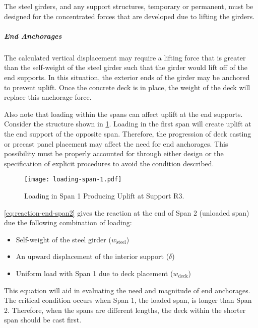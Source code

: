The steel girders, and any support structures, temporary or permanent, must be designed for the concentrated
forces that are developed due to lifting the girders.

\subparagraph*{End Anchorages}
The calculated vertical displacement may require a lifting force that is greater than the self-weight of the steel
girder such that the girder would lift off of the end supports. In this situation, the exterior ends of the girder may be
anchored to prevent uplift. Once the concrete deck is in place, the weight of the deck will replace this anchorage
force.

Also note that loading within the spans can affect uplift at the end supports. Consider the structure shown in
\cref{fig:loading-span-1}. Loading in the first span will create uplift at the end support of the opposite span. Therefore, the
progression of deck casting or precast panel placement may affect the need for end anchorages. This possibility must
be properly accounted for through either design or the specification of explicit procedures to avoid the condition
described.

\begin{figure}
  \texttt{[image: loading-span-1.pdf]}
  \caption{Loading in Span 1 Producing Uplift at Support R3.}
  \label{fig:loading-span-1}
\end{figure}

\cref{eq:reaction-end-span2} gives the reaction at the end of Span 2 (unloaded span) due the following combination of loading:
\begin{itemize}
  \item Self-weight of the steel girder ($w_\text{steel}$)
  \item An upward displacement of the interior support ($\delta$)
  \item Uniform load with Span 1 due to deck placement ($w_\text{deck}$)
\end{itemize}

This equation will aid in evaluating the need and magnitude of end anchorages. The critical condition occurs
when Span 1, the loaded span, is longer than Span 2. Therefore, when the spans are different lengths, the deck within
the shorter span should be cast first.

